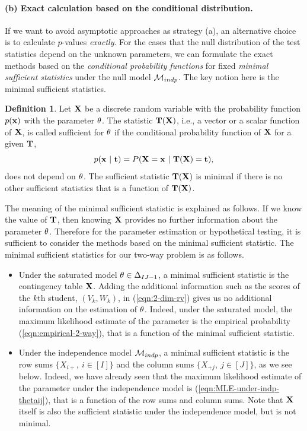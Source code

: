 \documentclass[12pt]{article}
\theoremstyle{definition}
\newtheorem{Definition}[Theorem]{Definition}
\def\Bt{{\bf t}}
\def\Bx{{\bf x}}
\def\BX{{\bf X}}
\def\Bt{{\bf t}}
\def\BT{{\bf T}}
\def\Btheta{{\bf \theta}}
\begin{document}
\paragraph*{(b) Exact calculation based on the conditional distribution.}
If we want to avoid asymptotic approaches as strategy (a),
an alternative 
choice is to calculate $p$-values {\it exactly}. For the cases that the null
distribution of the test statistics depend on the unknown parameters, 
we can formulate the exact methods based on the {\it conditional
probability functions} for fixed {\it minimal sufficient statistics}
under the null model ${\cal M}_{indp}$. The key notion here is the
minimal sufficient statistics.
\begin{Definition}
Let $\BX$ be a discrete random variable with the probability function
 $p(\Bx)$ with the parameter $\Btheta$.  
The statistic $\BT(\BX)$, i.e., a vector or a scalar function of $\BX$,
 is called sufficient for $\Btheta$ if the
 conditional probability function of $\BX$ for a given $\BT$,
\begin{equation}
 p(\Bx\ |\ \Bt) = P(\BX = \Bx\ |\ \BT(\BX) = \Bt),
\label{eqn:def-sufficient-statistics}
\end{equation}
does not depend on $\Btheta$. The sufficient statistic $\BT(\BX)$ is
 minimal if there is no other sufficient statistics that is a 
function of $\BT(\BX)$.  
\end{Definition}
The meaning of the minimal sufficient statistic is explained as
follows. If we know the value of $\BT$, then knowing $\BX$ provides no
further information about the parameter $\Btheta$. Therefore for the
parameter estimation or hypothetical testing, it is sufficient to
consider the methods based on the minimal sufficient statistic. 
The minimal sufficient statistics for our two-way problem is as follows.
\begin{itemize}
\item Under the saturated model $\Btheta \in {\Delta}_{IJ-1}$, a
      minimal sufficient statistic is the contingency table $\BX$. 
Adding the additional information such as the scores of the $k$th
      student, $(V_k, W_k)$, in (\ref{eqn:2-dim-rv}) gives us no
      additional information on the estimation of $\Btheta$. Indeed, 
      under the saturated model, the maximum likelihood estimate of the
      parameter is the empirical probability (\ref{eqn:empirical-2-way}),
      that is a function of the minimal sufficient statistic. 
\item Under the independence model ${\cal M}_{indp}$, a minimal
      sufficient statistic is the row sums $\{X_{i+},\ i \in [I]\}$ and
      the column
      sums $\{X_{+j},\ j \in [J]\}$, as we see below. Indeed,  
      we have already seen that the maximum likelihood estimate of
      the parameter under the independence model is
      (\ref{eqn:MLE-under-indp-thetaij}), that is a function of the row
      sums and column sums.
Note that $\BX$ itself is also the sufficient statistic under the
      independence model, but is not minimal. 
\end{itemize}
\end{document}
